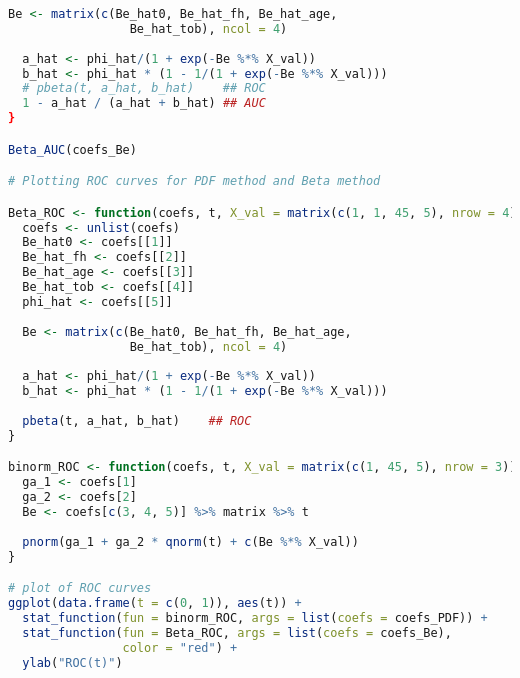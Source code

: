 \documentclass{article}
\begin{document}
\begin{lstlisting}[language=R]
  Be <- matrix(c(Be_hat0, Be_hat_fh, Be_hat_age,
                 Be_hat_tob), ncol = 4)
  
  a_hat <- phi_hat/(1 + exp(-Be %*% X_val))
  b_hat <- phi_hat * (1 - 1/(1 + exp(-Be %*% X_val)))
  # pbeta(t, a_hat, b_hat)    ## ROC
  1 - a_hat / (a_hat + b_hat) ## AUC
}

Beta_AUC(coefs_Be)

# Plotting ROC curves for PDF method and Beta method

Beta_ROC <- function(coefs, t, X_val = matrix(c(1, 1, 45, 5), nrow = 4)){
  coefs <- unlist(coefs)
  Be_hat0 <- coefs[[1]]
  Be_hat_fh <- coefs[[2]]
  Be_hat_age <- coefs[[3]]
  Be_hat_tob <- coefs[[4]]
  phi_hat <- coefs[[5]]
  
  Be <- matrix(c(Be_hat0, Be_hat_fh, Be_hat_age,
                 Be_hat_tob), ncol = 4)
  
  a_hat <- phi_hat/(1 + exp(-Be %*% X_val))
  b_hat <- phi_hat * (1 - 1/(1 + exp(-Be %*% X_val)))
  
  pbeta(t, a_hat, b_hat)    ## ROC
}

binorm_ROC <- function(coefs, t, X_val = matrix(c(1, 45, 5), nrow = 3)){
  ga_1 <- coefs[1]
  ga_2 <- coefs[2]
  Be <- coefs[c(3, 4, 5)] %>% matrix %>% t
  
  pnorm(ga_1 + ga_2 * qnorm(t) + c(Be %*% X_val))
}

# plot of ROC curves
ggplot(data.frame(t = c(0, 1)), aes(t)) +
  stat_function(fun = binorm_ROC, args = list(coefs = coefs_PDF)) + 
  stat_function(fun = Beta_ROC, args = list(coefs = coefs_Be),
                color = "red") + 
  ylab("ROC(t)")

\end{lstlisting}
\end{document}
